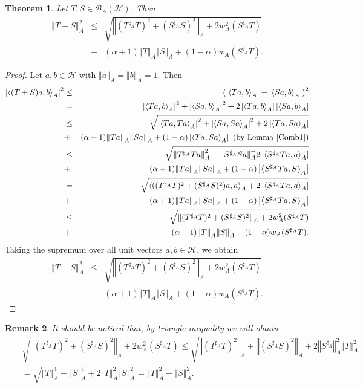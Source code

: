 \documentclass{article}
\newcommand{\bra}[1]{\left(#1\right)}
\newcommand{\seqA}[1]{{\left<#1\right>}_{A}}
\newcommand{\normA}[1]{{\left\Vert#1\right\Vert}_{A}}
\newcommand{\abs}[1]{\left\vert#1\right\vert}
\newcommand {\Sa}{S^{\sharp_{A}}}
\newcommand {\h}{\mathcal{H}}
\newcommand {\Ta}{T^{\sharp_{A}}}
\renewcommand {\b}{\mathcal{B}}
\newtheorem{theorem}{Theorem}[section]
\newtheorem{remark}[theorem]{Remark}
\begin{document}
\begin{theorem}\label{Theorem4.2} Let $T,S\in\b_A(\h)$. Then
\begin{eqnarray}\label{Comb2}
   \normA{T+S}^2&\leq& \sqrt{\normA{(\Ta T)^2+(\Sa S)^2}+2w_A^2(\Sa T)}\nonumber\\
   &+&(\alpha+1)\normA{T}\normA{S}+(1-\alpha)w_A(\Sa T).
\end{eqnarray}
\end{theorem}
\begin{proof} Let $a,b\in\h$ with $\normA{a}=\normA{b}=1$. Then
\begin{eqnarray*}
  \abs{\seqA{(T+S)a,b}}^2 &\leq&\bra{\abs{\seqA{Ta,b}}+\abs{\seqA{Sa,b}}}^2 \\
   &=&\abs{\seqA{Ta,b}}^2+\abs{\seqA{Sa,b}}^2+2\abs{\seqA{Ta,b}}\abs{\seqA{Sa,b}}\\
   &\leq& \sqrt{\abs{\seqA{Ta,Ta}}^2+\abs{\seqA{Sa,Sa}}^2+2\abs{\seqA{Ta,Sa}}}\\
   &+&(\alpha+1)\normA{Ta}\normA{Sa}+(1-\alpha)\abs{\seqA{Ta,Sa}} \,\,\bra{\mbox{by Lemma \ref{Comb1}}}\\
   &\leq& \sqrt{\normA{\Ta Ta}^2+\normA{\Sa Sa}^+2\abs{\seqA{\Sa Ta,a}}}\\
   &+&(\alpha+1)\normA{Ta}\normA{Sa}+(1-\alpha)\abs{\seqA{\Sa Ta,S}}\\
   &=&\sqrt{\seqA{((\Ta T)^2+(\Sa S)^2)a,a}+2\abs{\seqA{\Sa Ta,a}}}\\
   &+&(\alpha+1)\normA{Ta}\normA{Sa}+(1-\alpha)\abs{\seqA{\Sa Ta,S}}\\
   &\leq& \sqrt{\normA{(\Ta T)^2+(\Sa S)^2}+2w_A^2(\Sa T)}\\
   &+&(\alpha+1)\normA{T}\normA{S}+(1-\alpha)w_A(\Sa T).
\end{eqnarray*}
Taking the supremum over all unit vectors $a,b\in\h$, we obtain
\begin{eqnarray*}
  \normA{T+S}^2 &\leq&\sqrt{\normA{(\Ta T)^2+(\Sa S)^2}+2w_A^2(\Sa T)}\\
   &+&(\alpha+1)\normA{T}\normA{S}+(1-\alpha)w_A(\Sa T).
\end{eqnarray*}
\end{proof}
\begin{remark} It should be noticed that, by triangle inequality we will obtain
\begin{eqnarray*}
  &&\sqrt{\normA{(\Ta T)^2+(\Sa S)^2}+2w_A^2(\Sa T)}\leq \sqrt{\normA{(\Ta T)^2}+\normA{(\Sa S)^2}+2\normA{\Sa}^2\normA{T}^2} \\
  &&=\sqrt{\normA{T}^4+\normA{S}^4+2\normA{T}^2\normA{S}^2}=\normA{T}^2+\normA{S}^2.
\end{eqnarray*}
\end{remark}
\end{document}
